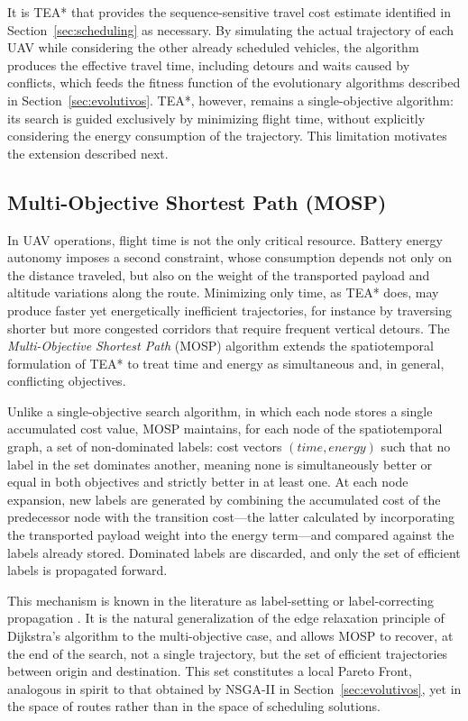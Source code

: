 It is TEA* that provides the sequence-sensitive travel cost estimate identified in Section~\ref{sec:scheduling} as necessary. By simulating the actual trajectory of each UAV while considering the other already scheduled vehicles, the algorithm produces the effective travel time, including detours and waits caused by conflicts, which feeds the fitness function of the evolutionary algorithms described in Section~\ref{sec:evolutivos}. TEA*, however, remains a single-objective algorithm: its search is guided exclusively by minimizing flight time, without explicitly considering the energy consumption of the trajectory. This limitation motivates the extension described next.

\subsection{Multi-Objective Shortest Path (MOSP)}\label{sec:mosp}

In UAV operations, flight time is not the only critical resource. Battery energy autonomy imposes a second constraint, whose consumption depends not only on the distance traveled, but also on the weight of the transported payload and altitude variations along the route. Minimizing only time, as TEA* does, may produce faster yet energetically inefficient trajectories, for instance by traversing shorter but more congested corridors that require frequent vertical detours. The \textit{Multi-Objective Shortest Path} (MOSP) algorithm extends the spatiotemporal formulation of TEA* to treat time and energy as simultaneous and, in general, conflicting objectives.

Unlike a single-objective search algorithm, in which each node stores a single accumulated cost value, MOSP maintains, for each node of the spatiotemporal graph, a set of non-dominated labels: cost vectors $(time, energy)$ such that no label in the set dominates another, meaning none is simultaneously better or equal in both objectives and strictly better in at least one. At each node expansion, new labels are generated by combining the accumulated cost of the predecessor node with the transition cost—the latter calculated by incorporating the transported payload weight into the energy term—and compared against the labels already stored. Dominated labels are discarded, and only the set of efficient labels is propagated forward.

This mechanism is known in the literature as label-setting or label-correcting propagation \cite{Martins1984, Raith2009}. It is the natural generalization of the edge relaxation principle of Dijkstra's algorithm to the multi-objective case, and allows MOSP to recover, at the end of the search, not a single trajectory, but the set of efficient trajectories between origin and destination. This set constitutes a local Pareto Front, analogous in spirit to that obtained by NSGA-II in Section~\ref{sec:evolutivos}, yet in the space of routes rather than in the space of scheduling solutions.

